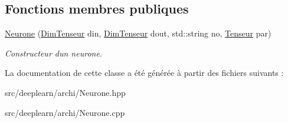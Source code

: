 \subsection*{Fonctions membres publiques}
\begin{DoxyCompactItemize}
\item 
\mbox{\label{classNeurone_af50116b497400f2b84f424854971f750}} 
\hyperlink{classNeurone_af50116b497400f2b84f424854971f750}{Neurone} (\hyperlink{classDimTenseur}{Dim\+Tenseur} din, \hyperlink{classDimTenseur}{Dim\+Tenseur} dout, std\+::string no, \hyperlink{classTenseur}{Tenseur} par)
\begin{DoxyCompactList}\small\item\em Constructeur d\textquotesingle{}un neurone. \end{DoxyCompactList}\end{DoxyCompactItemize}


La documentation de cette classe a été générée à partir des fichiers suivants \+:\begin{DoxyCompactItemize}
\item 
src/deeplearn/archi/Neurone.\+hpp\item 
src/deeplearn/archi/Neurone.\+cpp\end{DoxyCompactItemize}
